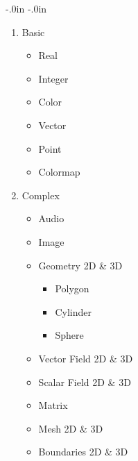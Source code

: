 % 
% 
%

\topmargin -0.45in
\textheight 9.0in
\oddsidemargin -.0in
\evensidemargin -.0in
\textwidth 6.5in




\begin{enumerate}
\item Basic
\begin{itemize}
\item Real
\item Integer
\item Color
\item Vector
\item Point
\item Colormap
\end{itemize}

\item Complex
\begin{itemize}
\item Audio
\item Image
\item Geometry 2D \& 3D
\begin{itemize}
\item  Polygon
\item  Cylinder
\item  Sphere
\end{itemize}

\item Vector Field 2D \& 3D
\item Scalar Field 2D \& 3D
\item Matrix
\item Mesh 2D \& 3D
\item Boundaries 2D \& 3D
\end{itemize}
\end{enumerate}


